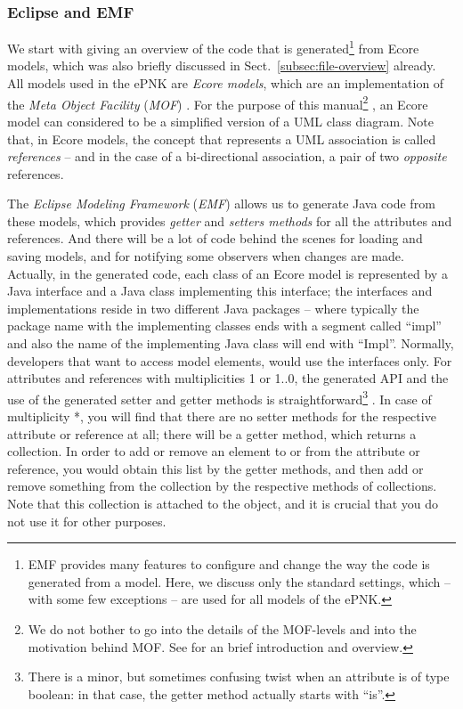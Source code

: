 \subsubsection{Eclipse and EMF}
\label{subsubsec:ePNK:API:EMF}

We start with giving an overview of the code that is generated\footnote
  {EMF provides many features to configure and change the way the code
   is generated from a model. Here, we discuss only the standard settings,
   which -- with some few exceptions -- are used for all models of the ePNK.}
from Ecore models, which was also briefly discussed in
Sect.~\ref{subsec:file-overview} already. All models used in the ePNK are
\emph{Ecore models},%
which are an implementation of the \emph{Meta Object Facility} (\emph{MOF})
\cite{MOF05}. For the purpose of this manual\footnote {We do not bother to go into the details of the MOF-levels and into the
   motivation behind MOF. See \cite{Kin09c} for an brief introduction and
   overview.}%
, an Ecore model can considered to be a simplified version of a UML class
diagram. Note that, in Ecore models, the concept that represents a UML
association is called \emph{references}%
-- and in the case of a bi-directional association, a pair of two
\emph{opposite} references.


%  
The \emph{Eclipse Modeling Framework} (\emph{EMF}) \cite{BSM06} allows us to
generate Java code from these models, which provides \emph{getter}%
and \emph{setters methods}%
for all the attributes and references. And there will be a lot of code behind
the scenes for loading and saving models, and for notifying some observers when
changes are made. Actually, in the generated code, each class of an Ecore model
is represented by a Java interface and a Java class implementing this interface;
the interfaces and implementations reside in two different Java packages --
where typically the package name with the implementing classes ends with a segment called ``impl'' and also
the name of the implementing Java class will end with ``Impl''. Normally, developers that want to access
model elements, would use the interfaces only. For attributes and references
with multiplicities 1 or 1..0, the generated API and the use of the generated
setter and getter methods is straightforward\footnote 
  {There is a minor, but sometimes confusing twist when an attribute is
   of type boolean: in that case, the getter method actually starts with
   ``is''.}%
.  In case of multiplicity *, you will find that there are no setter methods
for the respective attribute or reference at all; there will be a getter method,
which returns a collection. In order to add or remove an element to or from the
attribute or reference, you would obtain this list by the getter methods, and
then add or remove something from the collection by the respective methods of
collections. Note that this collection is attached to the object, and it is
crucial that you do not use it for other purposes.  

